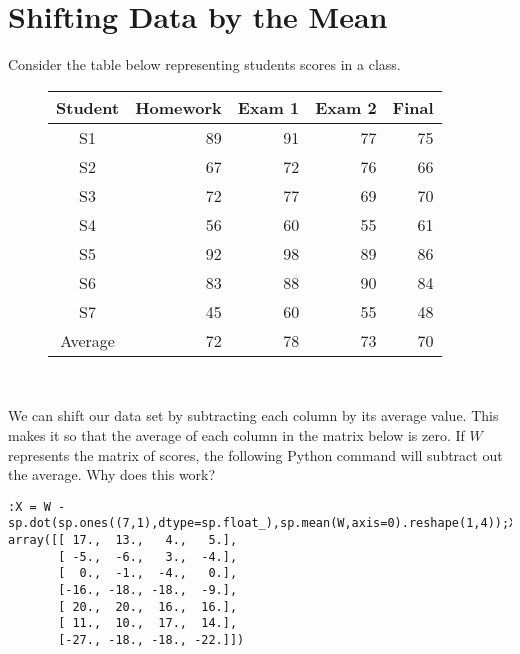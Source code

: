 \label{Stats1}


\section*{Shifting Data by the Mean}

Consider the table below representing students scores in a class.\\

\begin{figure}[h!]
\begin{center}
\begin{tabular}{|c|r|r|r|r|}
	\hline
Student & Homework & Exam 1  & Exam 2 & Final \\
\hline
S1  & 89 & 91 & 77 & 75 \\
S2  & 67 & 72 & 76 & 66 \\
S3  & 72 & 77 & 69 & 70 \\
S4  & 56 & 60 & 55 & 61 \\
S5  & 92 & 98 & 89 & 86 \\
S6  & 83 & 88 & 90 & 84 \\
S7  & 45 & 60 & 55 & 48 \\
\hline
Average  & 72 & 78 & 73 & 70\\
\hline
\end{tabular}\\
\end{center}
\end{figure}

We can shift our data set by subtracting each column by its average value.  This makes it so that the average of each column in the matrix below is zero.  If $W$ represents the matrix of scores, the following Python command will subtract out the average.  Why does this work?
\begin{lstlisting}[style=python]
:X = W - sp.dot(sp.ones((7,1),dtype=sp.float_),sp.mean(W,axis=0).reshape(1,4));X
array([[ 17.,  13.,   4.,   5.],
       [ -5.,  -6.,   3.,  -4.],
       [  0.,  -1.,  -4.,   0.],
       [-16., -18., -18.,  -9.],
       [ 20.,  20.,  16.,  16.],
       [ 11.,  10.,  17.,  14.],
       [-27., -18., -18., -22.]])
\end{lstlisting}


